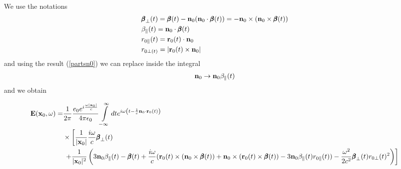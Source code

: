 We use the notations
\begin{align}
     & {\pmb \beta}_\perp(t) = {\pmb \beta}(t)-{\bf n}_0({\bf n}_0\cdot{\pmb \beta}(t)) = - {\bf n}_0\times({\bf n}_0\times{\pmb \beta}(t)) \\
     & \beta_\parallel(t) = {\bf n}_0\cdot{\pmb \beta}(t)                                                                                   \\
     & r_{0\parallel}(t) = {\bf r}_0(t)\cdot{\bf n}_0                                                                                       \\
     & r_{0\perp(t)} = |{\bf r}_0(t)\times{\bf n}_0|
\end{align}
and using the result (\ref{partsn0}) we can replace inside the integral
\begin{align}
    {\bf n}_0\rightarrow {\bf n}_0\beta_\parallel(t)
\end{align}
and we obtain
\begin{tcolorbox}[colback=blue!5!white,colframe=blue!75!black]
    \begin{align}
        {\bf E}({\bf x}_0,\omega) = & \frac1{2\pi}\frac{e_0 e^{i\frac{\omega|{\bf x}_0|}c}}{4\pi\epsilon_0}\int\limits_{-\infty}^{\infty}dte^{i\omega\left( t-\frac1c{\bf n}_0\cdot{\bf r}_0(t)\right)}\nonumber                                                                                                                                                         \\
                                    & \times\left[\frac{1}{|{\bf x}_0|}\frac{i\omega}c{\pmb \beta}_\perp(t)\right.\nonumber                                                                                                                                                                                                                                              \\
                                    & \left.\,+\frac1{|{\bf x}_0|^2}\left(3{\bf n}_0\beta_\parallel(t)-{\pmb \beta }(t)  + \frac{i\omega}c({\bf r}_0(t)\times({\bf n}_0\times{\pmb \beta}(t))+{\bf n}_0\times({\bf r}_0(t)\times{\pmb \beta}(t))-3{\bf n}_0 \beta_\parallel(t)r_{0\parallel}(t))-\frac{\omega^2}{2c^2}{\pmb \beta}_\perp(t)r_{0\perp}(t)^2\right)\right]
    \end{align}
\end{tcolorbox}
